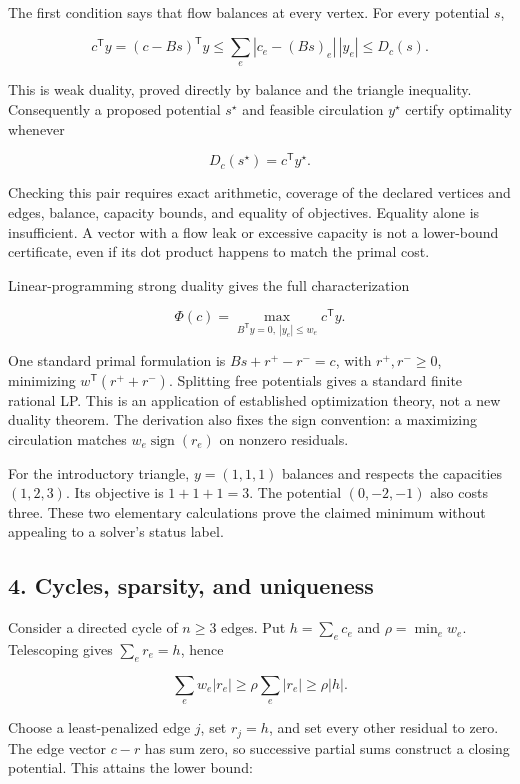 \documentclass[
  11pt,
]{article}
\begin{document}
The first condition says that flow balances at every vertex. For every
potential \(s\),

\[
c^\mathsf{T}y
=(c-Bs)^\mathsf{T}y
\leq \sum_e |c_e-(Bs)_e|\,|y_e|
\leq D_c(s).
\]

This is weak duality, proved directly by balance and the triangle
inequality. Consequently a proposed potential \(s^\star\) and feasible
circulation \(y^\star\) certify optimality whenever

\[
D_c(s^\star)=c^\mathsf{T}y^\star.
\]

Checking this pair requires exact arithmetic, coverage of the declared
vertices and edges, balance, capacity bounds, and equality of
objectives. Equality alone is insufficient. A vector with a flow leak or
excessive capacity is not a lower-bound certificate, even if its dot
product happens to match the primal cost.

Linear-programming strong duality gives the full characterization

\[
\Phi(c)=\max_{B^\mathsf{T}y=0,\ |y_e|\leq w_e}c^\mathsf{T}y.
\]

One standard primal formulation is \(Bs+r^+-r^-=c\), with
\(r^+,r^-\geq0\), minimizing \(w^\mathsf{T}(r^++r^-)\). Splitting free
potentials gives a standard finite rational LP. This is an application
of established optimization theory, not a new duality theorem. The
derivation also fixes the sign convention: a maximizing circulation
matches \(w_e\operatorname{sign}(r_e)\) on nonzero residuals.

For the introductory triangle, \(y=(1,1,1)\) balances and respects the
capacities \((1,2,3)\). Its objective is \(1+1+1=3\). The potential
\((0,-2,-1)\) also costs three. These two elementary calculations prove
the claimed minimum without appealing to a solver's status label.

\subsection{4. Cycles, sparsity, and
uniqueness}\label{cycles-sparsity-and-uniqueness}

Consider a directed cycle of \(n\geq3\) edges. Put \(h=\sum_e c_e\) and
\(\rho=\min_e w_e\). Telescoping gives \(\sum_e r_e=h\), hence

\[
\sum_e w_e|r_e|\geq\rho\sum_e|r_e|\geq\rho|h|.
\]

Choose a least-penalized edge \(j\), set \(r_j=h\), and set every other
residual to zero. The edge vector \(c-r\) has sum zero, so successive
partial sums construct a closing potential. This attains the lower
bound:
\end{document}
